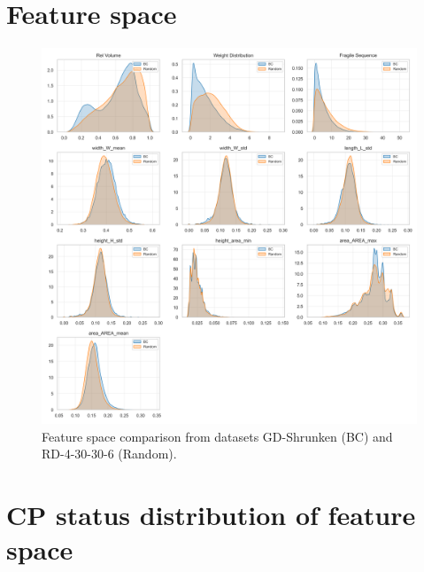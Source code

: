 \section{Feature space}
\label{app:sec:feature_space}
\begin{figure}[!ht]
	\centering
	\includegraphics[width=\textwidth]{pictures/dataset_structure/featureSpace_random_BC.png}
	\caption{Feature space comparison from datasets GD-Shrunken (BC) and RD-4-30-30-6 (Random).}
	\label{fig:feature_space}
\end{figure}
\clearpage

\section{CP status distribution of feature space}
\label{app:sec:feature_space_cpStatus}

